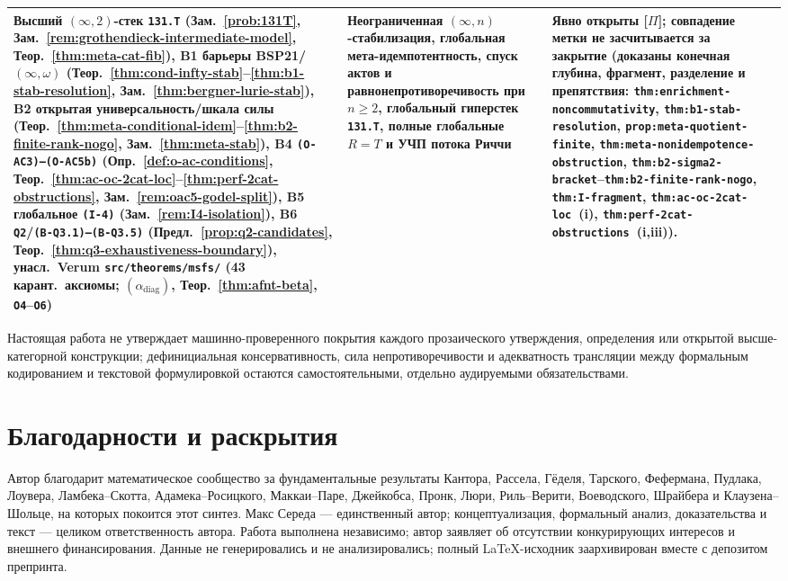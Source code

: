 \documentclass[11pt]{article}
\theoremstyle{plain}
\theoremstyle{definition}
\begin{document}
\begin{center}
\begin{tabular}{@{} >{\raggedright\arraybackslash}p{2.3cm} >{\raggedright\arraybackslash}p{3.9cm} >{\raggedright\arraybackslash}p{3.9cm} >{\raggedright\arraybackslash}p{3.9cm} @{}}
Высший $(\infty,2)$-стек \texttt{131.T} (Зам.~\ref{prob:131T}, Зам.~\ref{rem:grothendieck-intermediate-model}, Теор.~\ref{thm:meta-cat-fib}), B1 барьеры BSP21/$(\infty,\omega)$ (Теор.~\ref{thm:cond-infty-stab}--\ref{thm:b1-stab-resolution}, Зам.~\ref{thm:bergner-lurie-stab}), B2 открытая универсальность/шкала силы (Теор.~\ref{thm:meta-conditional-idem}--\ref{thm:b2-finite-rank-nogo}, Зам.~\ref{thm:meta-stab}), B4 \texttt{(O-AC3)--(O-AC5b)} (Опр.~\ref{def:o-ac-conditions}, Теор.~\ref{thm:ac-oc-2cat-loc}--\ref{thm:perf-2cat-obstructions}, Зам.~\ref{rem:oac5-godel-split}), B5 глобальное \texttt{(I-4)} (Зам.~\ref{rem:I4-isolation}), B6 \texttt{Q2}/\texttt{(B-Q3.1)--(B-Q3.5)} (Предл.~\ref{prop:q2-candidates}, Теор.~\ref{thm:q3-exhaustiveness-boundary}), унасл.\ Verum \texttt{src/\allowbreak theorems/\allowbreak msfs/} (43 карант.\ аксиомы; $(\alpha_{\mathrm{diag}})$, Теор.~\ref{thm:afnt-beta}, \texttt{O4}--\texttt{O6}) &
Неограниченная $(\infty,n)$-стабилизация, глобальная мета-идемпотентность, спуск актов и равнонепротиворечивость при $n\ge 2$, глобальный гиперстек \texttt{131.T}, полные глобальные $R=T$ и УЧП потока Риччи &
Явно открыты \textup{[\textbf{$\Pi$}]}; совпадение метки не засчитывается за закрытие (доказаны конечная глубина, фрагмент, разделение и препятствия: \texttt{thm:enrichment-noncommutativity}, \texttt{thm:b1-stab-resolution}, \texttt{prop:meta-quotient-finite}, \texttt{thm:meta-nonidempotence-obstruction}, \texttt{thm:b2-sigma2-bracket}--\texttt{thm:b2-finite-rank-nogo}, \texttt{thm:I-fragment}, \texttt{thm:ac-oc-2cat-loc}~(i), \texttt{thm:perf-2cat-obstructions}~(i,iii)). \\
\bottomrule
\end{tabular}
\end{center}
Настоящая работа не утверждает машинно-проверенного покрытия каждого прозаического утверждения, определения или открытой высше-категорной конструкции; дефинициальная консервативность, сила непротиворечивости и адекватность трансляции между формальным кодированием и текстовой формулировкой остаются самостоятельными, отдельно аудируемыми обязательствами.

\section*{Благодарности и раскрытия}

Автор благодарит математическое сообщество за фундаментальные результаты Кантора, Рассела, Гёделя, Тарского, Фефермана, Пудлака, Лоувера, Ламбека--Скотта, Адамека--Росицкого, Маккаи--Паре, Джейкобса, Пронк, Люри, Риль--Верити, Воеводского, Шрайбера и Клаузена--Шольце, на которых покоится этот синтез. Макс Середа — единственный автор; концептуализация, формальный анализ, доказательства и текст — целиком ответственность автора. Работа выполнена независимо; автор заявляет об отсутствии конкурирующих интересов и внешнего финансирования. Данные не генерировались и не анализировались; полный LaTeX-исходник заархивирован вместе с депозитом препринта.
\end{document}
